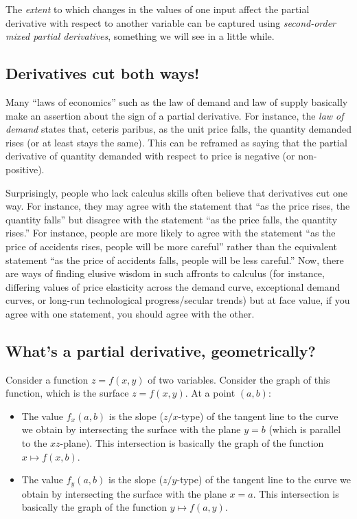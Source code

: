 \documentclass[10pt]{amsart}
\begin{document}
The {\em extent} to which changes in the values of one input affect
the partial derivative with respect to another variable can be
captured using {\em second-order mixed partial derivatives}, something
we will see in a little while.

\subsection*{Derivatives cut both ways!}

Many ``laws of economics'' such as the law of demand and law of supply
basically make an assertion about the sign of a partial
derivative. For instance, the {\em law of demand} states that, ceteris
paribus, as the unit price falls, the quantity demanded rises (or at
least stays the same). This can be reframed as saying that the partial
derivative of quantity demanded with respect to price is negative (or
non-positive).

Surprisingly, people who lack calculus skills often believe that
derivatives cut one way. For instance, they may agree with the
statement that ``as the price rises, the quantity falls'' but disagree
with the statement ``as the price falls, the quantity rises.'' For
instance, people are more likely to agree with the statement ``as the
price of accidents rises, people will be more careful'' rather than
the equivalent statement ``as the price of accidents falls, people
will be less careful.'' Now, there are ways of finding elusive wisdom
in such affronts to calculus (for instance, differing values of price
elasticity across the demand curve, exceptional demand curves, or
long-run technological progress/secular trends) but at face value, if
you agree with one statement, you should agree with the other.

\subsection{What's a partial derivative, geometrically?}

Consider a function $z = f(x,y)$ of two variables. Consider the graph
of this function, which is the surface $z = f(x,y)$. At a point
$(a,b)$:

\begin{itemize}
\item The value $f_x(a,b)$ is the slope ($z/x$-type) of the tangent
  line to the curve we obtain by intersecting the surface with the
  plane $y = b$ (which is parallel to the $xz$-plane). This
  intersection is basically the graph of the function $x \mapsto
  f(x,b)$.
\item The value $f_y(a,b)$ is the slope ($z/y$-type) of the tangent
  line to the curve we obtain by intersecting the surface with the
  plane $x = a$. This intersection is basically the graph of the
  function $y \mapsto f(a,y)$.
\end{itemize}
\end{document}
